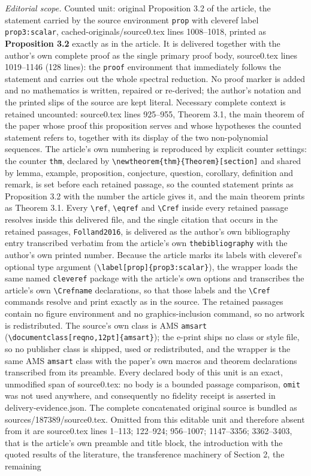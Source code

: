 \documentclass[10pt,a4paper]{amsart}
\numberwithin{equation}{section}
\begin{document}
\noindent\textit{Editorial scope.} Counted unit: original Proposition 3.2 of the article, the statement carried by the source environment \texttt{prop} with cleveref label \texttt{prop3:scalar}, cached-originals/source0.tex lines 1008--1018, printed as \textbf{Proposition 3.2} exactly as in the article. It is delivered together with the author’s own complete proof as the single primary proof body, source0.tex lines 1019--1146 (128 lines): the \texttt{proof} environment that immediately follows the statement and carries out the whole spectral reduction. No proof marker is added and no mathematics is written, repaired or re-derived; the author’s notation and the printed slips of the source are kept literal. Necessary complete context is retained uncounted: source0.tex lines 925--955, Theorem 3.1, the main theorem of the paper whose proof this proposition serves and whose hypotheses the counted statement refers to, together with its display of the two non-polynomial sequences. The article’s own numbering is reproduced by explicit counter settings: the counter \texttt{thm}, declared by \texttt{\textbackslash newtheorem\{thm\}\{Theorem\}[section]} and shared by lemma, example, proposition, conjecture, question, corollary, definition and remark, is set before each retained passage, so the counted statement prints as Proposition 3.2 with the number the article gives it, and the main theorem prints as Theorem 3.1. Every \texttt{\textbackslash ref}, \texttt{\textbackslash eqref} and \texttt{\textbackslash Cref} inside every retained passage resolves inside this delivered file, and the single citation that occurs in the retained passages, \texttt{Folland2016}, is delivered as the author’s own bibliography entry transcribed verbatim from the article’s own \texttt{thebibliography} with the author’s own printed number. Because the article marks its labels with cleveref’s optional type argument (\texttt{\textbackslash label[prop]\{prop3:scalar\}}), the wrapper loads the same named \texttt{cleveref} package with the article’s own options and transcribes the article’s own \texttt{\textbackslash Crefname} declarations, so that those labels and the \texttt{\textbackslash Cref} commands resolve and print exactly as in the source. The retained passages contain no figure environment and no graphics-inclusion command, so no artwork is redistributed. The source’s own class is AMS \texttt{amsart} (\texttt{\textbackslash documentclass[reqno,12pt]\{amsart\}}); the e-print ships no class or style file, so no publisher class is shipped, used or redistributed, and the wrapper is the same AMS \texttt{amsart} class with the paper’s own macros and theorem declarations transcribed from its preamble. Every declared body of this unit is an exact, unmodified span of source0.tex: no body is a bounded passage comparison, \texttt{omit} was not used anywhere, and consequently no fidelity receipt is asserted in delivery-evidence.json. The complete concatenated original source is bundled as sources/187389/source0.tex. Omitted from this editable unit and therefore absent from it are source0.tex lines 1--113; 122--924; 956--1007; 1147--3356; 3362--3403, that is the article’s own preamble and title block, the introduction with the quoted results of the literature, the transference machinery of Section 2, the remaining 
\end{document}
